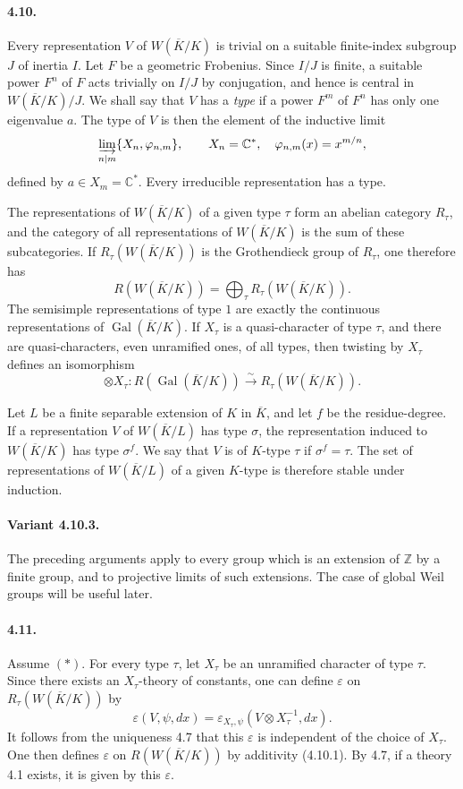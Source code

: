 \documentclass[10pt]{article}
\newcommand{\C}{\mathbb C}
\newcommand{\Z}{\mathbb Z}
\newcommand{\Gal}{\operatorname{Gal}}
\newcommand{\iso}{\xrightarrow{\sim}}
\providecommand{\Gal}{\operatorname{Gal}}
\providecommand{\Gal}{\operatorname{Gal}}
\providecommand{\Gal}{\operatorname{Gal}}
\providecommand{\Gal}{\operatorname{Gal}}
\begin{document}
\paragraph{4.10.} Every representation \(V\) of \(W(\overline K/K)\) is trivial on a suitable finite-index subgroup \(J\) of inertia \(I\). Let \(F\) be a geometric Frobenius. Since \(I/J\) is finite, a suitable power \(F^n\) of \(F\) acts trivially on \(I/J\) by conjugation, and hence is central in \(W(\overline K/K)/J\). We shall say that \(V\) has a \emph{type} if a power \(F^m\) of \(F^n\) has only one eigenvalue \(a\). The type of \(V\) is then the element of the inductive limit
\[
\varinjlim_{n\mid m}\{X_n,\varphi_{n,m}\},\qquad
X_n=\C^*,\quad \varphi_{n,m}(x)=x^{m/n},
\]
defined by \(a\in X_m=\C^*\). Every irreducible representation has a type.

The representations of \(W(\overline K/K)\) of a given type \(\tau\) form an abelian category \(R_\tau\), and the category of all representations of \(W(\overline K/K)\) is the sum of these subcategories. If \(R_\tau(W(\overline K/K))\) is the Grothendieck group of \(R_\tau\), one therefore has
\[
\tag{4.10.1}
R(W(\overline K/K))=\bigoplus_\tau R_\tau(W(\overline K/K)).
\]
The semisimple representations of type \(1\) are exactly the continuous representations of \(\Gal(\overline K/K)\). If \(X_\tau\) is a quasi-character of type \(\tau\), and there are quasi-characters, even unramified ones, of all types, then twisting by \(X_\tau\) defines an isomorphism
\[
\tag{4.10.2}
\otimes X_\tau:R(\Gal(\overline K/K))\iso R_\tau(W(\overline K/K)).
\]

Let \(L\) be a finite separable extension of \(K\) in \(\overline K\), and let \(f\) be the residue-degree. If a representation \(V\) of \(W(\overline K/L)\) has type \(\sigma\), the representation induced to \(W(\overline K/K)\) has type \(\sigma^f\). We say that \(V\) is of \(K\)-type \(\tau\) if \(\sigma^f=\tau\). The set of representations of \(W(\overline K/L)\) of a given \(K\)-type is therefore stable under induction.

\paragraph{Variant 4.10.3.} The preceding arguments apply to every group which is an extension of \(\Z\) by a finite group, and to projective limits of such extensions. The case of global Weil groups will be useful later.

\paragraph{4.11.} Assume \((*)\). For every type \(\tau\), let \(X_\tau\) be an unramified character of type \(\tau\). Since there exists an \(X_\tau\)-theory of constants, one can define \(\varepsilon\) on \(R_\tau(W(\overline K/K))\) by
\[
\varepsilon(V,\psi,dx)=
\varepsilon_{X_\tau,\psi}(V\otimes X_\tau^{-1},dx).
\]
It follows from the uniqueness 4.7 that this \(\varepsilon\) is independent of the choice of \(X_\tau\). One then defines \(\varepsilon\) on \(R(W(\overline K/K))\) by additivity (4.10.1). By 4.7, if a theory 4.1 exists, it is given by this \(\varepsilon\).
\end{document}
